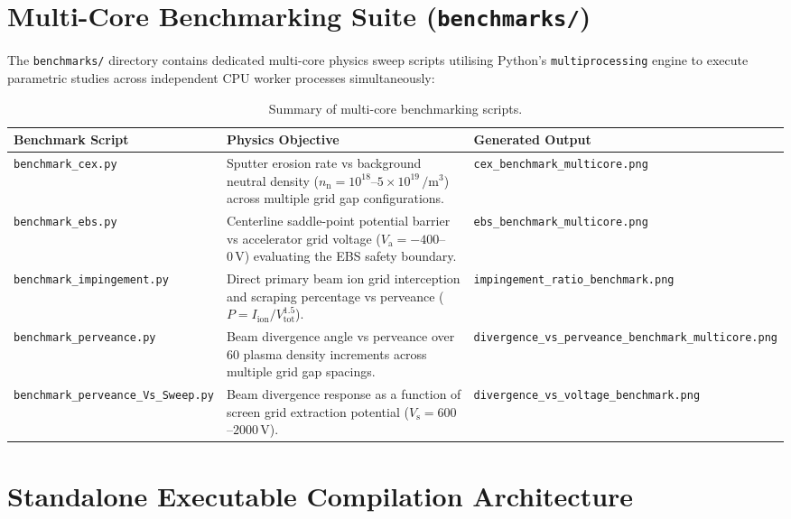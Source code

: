 \documentclass[11pt,a4paper]{article}
\begin{document}
\section{Multi-Core Benchmarking Suite (\texttt{benchmarks/})}

The \texttt{benchmarks/} directory contains dedicated multi-core physics sweep scripts utilising Python's \texttt{multiprocessing} engine to execute parametric studies across independent CPU worker processes simultaneously:

\begin{table}[h!]
\centering
\small
\begin{tabular}{lp{6cm}p{4.5cm}}
\toprule
\textbf{Benchmark Script} & \textbf{Physics Objective} & \textbf{Generated Output} \\
\midrule
\texttt{benchmark\_cex.py} & Sputter erosion rate vs background neutral density ($n_{\mathrm{n}} = 10^{18}$--$5\times 10^{19}\,\si{\per\meter\cubed}$) across multiple grid gap configurations. & \texttt{cex\_benchmark\_multicore.png} \\
\addlinespace
\texttt{benchmark\_ebs.py} & Centerline saddle-point potential barrier vs accelerator grid voltage ($V_{\mathrm{a}} = -400$--$0\,\si{\volt}$) evaluating the EBS safety boundary. & \texttt{ebs\_benchmark\_multicore.png} \\
\addlinespace
\texttt{benchmark\_impingement.py} & Direct primary beam ion grid interception and scraping percentage vs perveance ($P = I_{\mathrm{ion}} / V_{\mathrm{tot}}^{1.5}$). & \texttt{impingement\_ratio\_benchmark.png} \\
\addlinespace
\texttt{benchmark\_perveance.py} & Beam divergence angle vs perveance over 60 plasma density increments across multiple grid gap spacings. & \texttt{divergence\_vs\_perveance\_benchmark\_multicore.png} \\
\addlinespace
\texttt{benchmark\_perveance\_Vs\_Sweep.py} & Beam divergence response as a function of screen grid extraction potential ($V_{\mathrm{s}} = 600$--$2000\,\si{\volt}$). & \texttt{divergence\_vs\_voltage\_benchmark.png} \\
\bottomrule
\end{tabular}
\caption{Summary of multi-core benchmarking scripts.}
\end{table}

\section{Standalone Executable Compilation Architecture}
\end{document}
